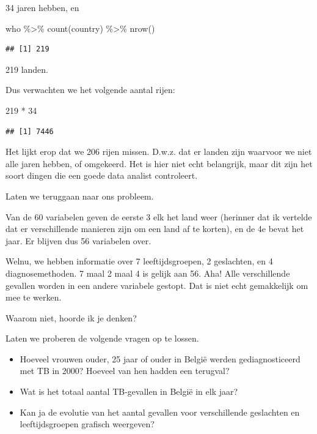 \documentclass[]{tufte-book}
\newenvironment{Shaded}{}{}
\newcommand{\DecValTok}[1]{\textcolor[rgb]{0.25,0.63,0.44}{#1}}
\newcommand{\FunctionTok}[1]{\textcolor[rgb]{0.02,0.16,0.49}{#1}}
\newcommand{\NormalTok}[1]{#1}
\newcommand{\SpecialCharTok}[1]{\textcolor[rgb]{0.25,0.44,0.63}{#1}}
\providecommand{\tightlist}{%
  \setlength{\itemsep}{0pt}\setlength{\parskip}{0pt}}
\begin{document}
34 jaren hebben, en

\begin{Shaded}
\begin{Highlighting}[]
\NormalTok{who }\SpecialCharTok{\%\textgreater{}\%}
  \FunctionTok{count}\NormalTok{(country) }\SpecialCharTok{\%\textgreater{}\%}
  \FunctionTok{nrow}\NormalTok{()}
\end{Highlighting}
\end{Shaded}

\begin{verbatim}
## [1] 219
\end{verbatim}

219 landen.

Dus verwachten we het volgende aantal rijen:

\begin{Shaded}
\begin{Highlighting}[]
\DecValTok{219} \SpecialCharTok{*} \DecValTok{34}
\end{Highlighting}
\end{Shaded}

\begin{verbatim}
## [1] 7446
\end{verbatim}

Het lijkt erop dat we 206 rijen missen. D.w.z. dat er landen zijn waarvoor we niet alle jaren hebben, of omgekeerd. Het is hier niet echt belangrijk, maar dit zijn het soort dingen die een goede data analist controleert.

Laten we teruggaan naar ons probleem.

Van de 60 variabelen geven de eerste 3 elk het land weer (herinner dat ik vertelde dat er verschillende manieren zijn om een land af te korten), en de 4e bevat het jaar. Er blijven dus 56 variabelen over.

Welnu, we hebben informatie over 7 leeftijdsgroepen, 2 geslachten, en 4 diagnosemethoden. 7 maal 2 maal 4 is gelijk aan 56. Aha! Alle verschillende gevallen worden in een andere variabele gestopt. Dat is niet echt gemakkelijk om mee te werken.

Waarom niet, hoorde ik je denken?

Laten we proberen de volgende vragen op te lossen.

\begin{itemize}
\tightlist
\item
  Hoeveel vrouwen ouder, 25 jaar of ouder in België werden gediagnosticeerd met TB in 2000? Hoeveel van hen hadden een terugval?
\item
  Wat is het totaal aantal TB-gevallen in België in elk jaar?
\item
  Kan ja de evolutie van het aantal gevallen voor verschillende geslachten en leeftijdsgroepen grafisch weergeven?
\end{itemize}
\end{document}
